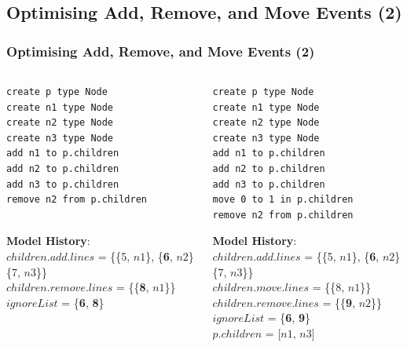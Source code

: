 \documentclass{beamer}
\begin{document}
\begin{frame}[fragile]
\section{Optimising Add, Remove, and Move Events (2)}
\frametitle{Optimising Add, Remove, and Move Events (2)}

\begin{columns}
\begin{column}[t]{0.5\linewidth}
\begin{lstlisting}[style=eol,caption={A CBP of add and remove operations.},label=lst:add_move_reference]
create p type Node
create n1 type Node
create n2 type Node
create n3 type Node
add n1 to p.children
add n2 to p.children
add n3 to p.children
remove n2 from p.children
   
\end{lstlisting}

\begin{footnotesize}
\textbf{Model History}:\\
$children$.$add$.$lines$ = \{\{5, $n1$\}, \{\textbf{6}, $n2$\} \{7, $n3$\}\}\\
$children$.$remove$.$lines$ = \{\{\textbf{8}, $n1$\}\}\\
$ignoreList$ = \{\textbf{6}, \textbf{8}\}
\end{footnotesize}

\end{column}
\begin{column}[t]{0.5\linewidth}
\begin{lstlisting}[style=eol,caption={A CBP representation of add, move, and remove operations.},label=lst:add_remove_move_reference]
create p type Node         
create n1 type Node        
create n2 type Node        
create n3 type Node        
add n1 to p.children     
add n2 to p.children     
add n3 to p.children     
move 0 to 1 in p.children
remove n2 from p.children
\end{lstlisting}

\begin{footnotesize}
\textbf{Model History}:\\
$children$.$add$.$lines$ = \{\{5, $n1$\}, \{\textbf{6}, $n2$\} \{7, $n3$\}\}\\
$children$.$move$.$lines$ = \{\{8, $n1$\}\}\\
$children$.$remove$.$lines$ = \{\{\textbf{9}, $n2$\}\}\\
$ignoreList$ = \{\textbf{6}, \textbf{9}\}\\
$p$.$children$ = [$n1$, $n3$]
\end{footnotesize}

\end{column}
\end{columns}

\end{frame}
\end{document}
